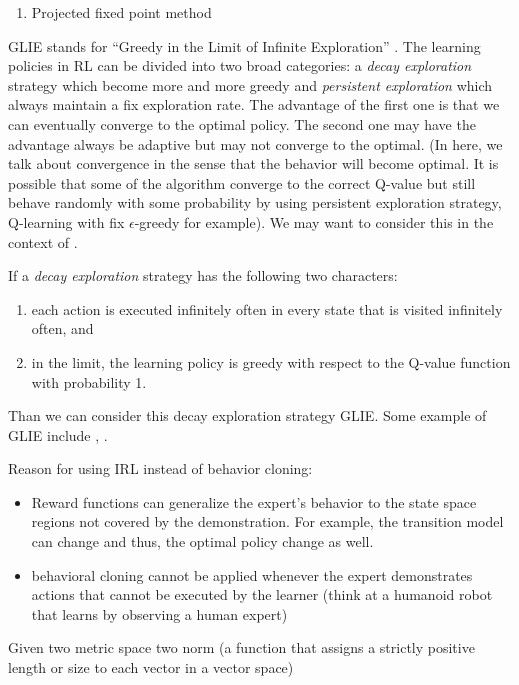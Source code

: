 \documentclass[9pt]{article}
\begin{document}
\begin{enumerate}
\item Projected fixed point method 
\end{enumerate}

GLIE stands for ``Greedy in the Limit of Infinite Exploration'' \citep{singh2000convergence}. The learning policies in RL can be divided into two broad categories: a \textit{decay exploration} strategy which become more and more greedy and \textit{persistent exploration} which always maintain a fix exploration rate. The advantage of the first one is that we can eventually converge to the optimal policy. The second one may have the advantage always be adaptive but may not converge to the optimal. (In here, we talk about convergence in the sense that the behavior will become optimal. It is possible that some of the algorithm converge to the correct Q-value but still behave randomly with some probability by using persistent exploration strategy, Q-learning with fix $\epsilon$-greedy for example). We may want to consider this in the context of .

If a \textit{decay exploration} strategy has the following two characters:
\begin{enumerate}
\item each action is executed infinitely often in every state that is visited infinitely often, and
\item in the limit, the learning policy is greedy with respect to the Q-value function with probability 1.
\end{enumerate}
Than we can consider this decay exploration strategy GLIE. Some example of GLIE include , .

Reason for using IRL instead of behavior cloning:
\begin{itemize}
\item Reward functions can generalize the expert's behavior to the state space regions not covered by the demonstration. For example, the transition model can change and thus, the optimal policy change as well. 
\item behavioral cloning cannot be applied whenever the expert demonstrates actions that cannot be executed by the
learner (think at a humanoid robot that learns by observing a human expert)
\end{itemize}

  Given two metric space two norm (a function that assigns  a strictly positive length or size to each vector in a vector space)
\end{document}
